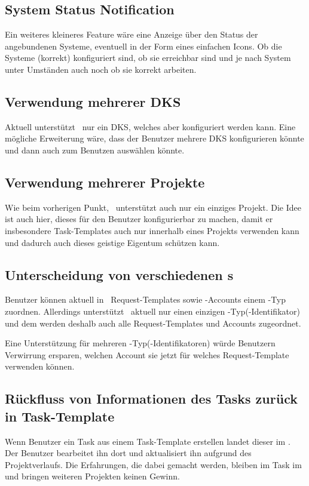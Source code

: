 			
		\subsection{System Status Notification}
			Ein weiteres kleineres Feature wäre eine Anzeige über den Status der angebundenen Systeme,
			eventuell in der Form eines einfachen Icons.
			Ob die Systeme (korrekt) konfiguriert sind, ob sie erreichbar sind
			und je nach System unter Umständen auch noch ob sie korrekt arbeiten.
		
		
		
	
		\subsection{Verwendung mehrerer DKS}
			Aktuell unterstützt \eeppi\ nur ein DKS, welches aber konfiguriert werden kann.
			Eine mögliche Erweiterung wäre, dass der Benutzer mehrere DKS konfigurieren könnte
			und dann auch zum Benutzen auswählen könnte.
		
		
		\subsection{Verwendung mehrerer Projekte}
			Wie beim vorherigen Punkt, \eeppi\ unterstützt auch nur ein einziges Projekt.
			Die Idee ist auch hier, dieses für den Benutzer konfigurierbar zu machen,
			damit er insbesondere Task-Templates auch nur innerhalb eines Projekts verwenden kann
			und dadurch auch dieses geistige Eigentum schützen kann.


		\subsection{Unterscheidung von verschiedenen \ppt s}
			Benutzer können aktuell in \eeppi\ Request-Templates sowie \ppt-Accounts einem \ppt-Typ zuordnen.
			Allerdings unterstützt \eeppi\ aktuell nur einen einzigen \ppt-Typ(-Identifikator)
			und dem werden deshalb auch alle Request-Templates und Accounts zugeordnet.
			
			Eine Unterstützung für mehreren \ppt-Typ(-Identifikatoren) würde Benutzern Verwirrung ersparen,
			welchen Account sie jetzt für welches Request-Template verwenden können.
			
		\subsection{Rückfluss von Informationen des Tasks zurück in Task-Template}
		\label{subsec:informationFlowbackFeature}
			Wenn Benutzer ein Task aus einem Task-Template erstellen landet dieser im \ppt.
			Der Benutzer bearbeitet ihn dort und aktualisiert ihn aufgrund des Projektverlaufs.
			Die Erfahrungen, die dabei gemacht werden, bleiben im Task im \ppt
			und bringen weiteren Projekten keinen Gewinn.
			
